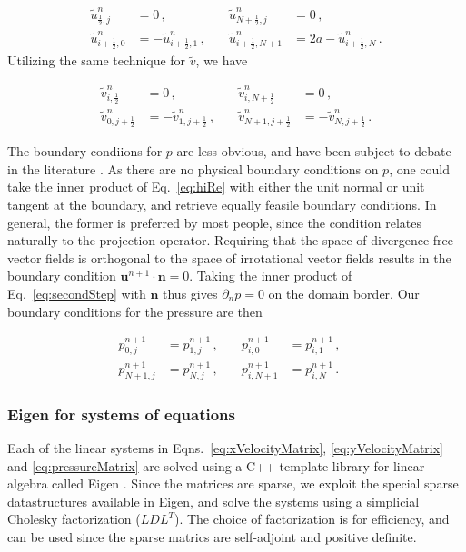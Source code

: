 \documentclass[final,3p,twocolumn]{elsarticle}
\begin{document}
\begin{align}
    \nonumber 
    \tilde{u}_{\frac{1}{2},j}^n &= 0 \,, &\quad \tilde{u}_{N + \frac{1}{2},j}^n
    &= 0 \,, \\
    \label{eq:xVelocityBCs}
    \tilde{u}_{i+\frac{1}{2},0}^n &= - \tilde{u}_{i+\frac{1}{2},1}^n \,, &\quad
    \tilde{u}_{i+\frac{1}{2},N+1}^n &= 2a - \tilde{u}_{i+\frac{1}{2},N}^n \,.
\end{align}
%
Utilizing the same technique for $\tilde{v}$, we have 

\begin{align}
    \nonumber
    \tilde{v}_{i,\frac{1}{2}}^n &= 0 \,, &\quad 
    \tilde{v}_{i, N + \frac{1}{2}}^n &= 0 \,, \\
    \label{eq:yVelocityBCs}
    \tilde{v}_{0, j+\frac{1}{2}}^n &= - \tilde{v}_{1, j+\frac{1}{2}}^n \,,
    &\quad \tilde{v}_{N+1, j+\frac{1}{2}}^n &= - \tilde{v}_{N, j+\frac{1}{2}}^n
    \,.
\end{align}

The boundary condiions for $p$ are less obvious, and have been subject to
debate in the literature \cite{liu1995projection}. As there are no physical
boundary conditions on $p$, one could take the inner product of Eq.\
\eqref{eq:hiRe} with either the unit normal or unit tangent at the boundary,
and retrieve equally feasile boundary conditions. In general, the former is
preferred by most people, since the condition relates naturally to the
projection operator. Requiring that the space of divergence-free vector fields
is orthogonal to the space of irrotational vector fields results in the boundary
condition $\bm{u}^{n+1} \cdot \bm{n} = 0$. Taking the inner product of Eq.\
\eqref{eq:secondStep} with $\bm{n}$ thus gives $\partial_n p = 0$ on the
domain border. Our boundary conditions for the pressure are then

\begin{align}
    \nonumber
    p_{0,j}^{n+1} &= p_{1,j}^{n+1} \,, &\quad p_{i,0}^{n+1} &= p_{i,1}^{n+1}
    \,, \quad \\
    \label{eq:pressureBCs}
    p_{N+1,j}^{n+1} &= p_{N,j}^{n+1} \,, &\quad p_{i,N+1}^{n+1} &=
    p_{i,N}^{n+1} \,.
\end{align}

\subsubsection{Eigen for systems of equations}

Each of the linear systems in Eqns.\ \eqref{eq:xVelocityMatrix},
\eqref{eq:yVelocityMatrix} and \eqref{eq:pressureMatrix} are solved using a C++
template library for linear algebra called Eigen \cite{eigenweb}. Since the
matrices are sparse, we exploit the special sparse datastructures available in
Eigen, and solve the systems using a simplicial Cholesky factorization
($LDL^T$). The choice of factorization is for efficiency, and can be used since
the sparse matrics are self-adjoint and positive definite. 
\end{document}

